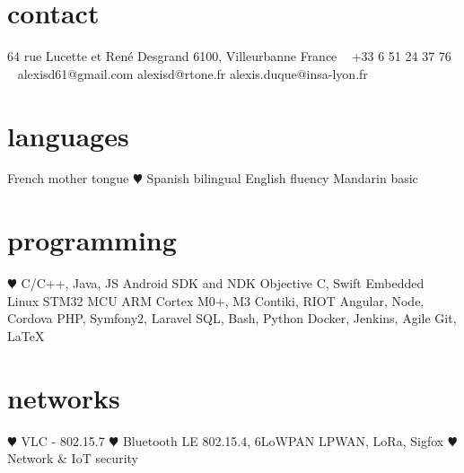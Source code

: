 \documentclass[]{cv-style}          %
\begin{document}
\lastupdated


\begin{aside}
%
\section{contact}
64 rue Lucette et René Desgrand
6100, Villeurbanne
France
~
+33 6 51 24 37 76
~
alexisd61@gmail.com
alexisd@rtone.fr
alexis.duque@insa-lyon.fr
%
\section{languages}
French mother tongue
{\color{red} $\varheartsuit$} Spanish bilingual
English fluency
Mandarin basic
%
\section{programming}
{\color{red} $\varheartsuit$} C/C++, Java, JS
Android SDK and NDK
Objective C, Swift
Embedded Linux
STM32 MCU
ARM Cortex M0+, M3
Contiki, RIOT
Angular, Node, Cordova
PHP, Symfony2, Laravel
SQL, Bash, Python
Docker, Jenkins, Agile
Git, \LaTeX{}
%
\section{networks}
{\color{red} $\varheartsuit$} VLC - 802.15.7
{\color{red} $\varheartsuit$} Bluetooth LE
802.15.4, 6LoWPAN
LPWAN, LoRa, Sigfox
{\color{red} $\varheartsuit$} Network \& IoT security
%
\end{aside}





\vspace{0.15cm}
\end{document}
